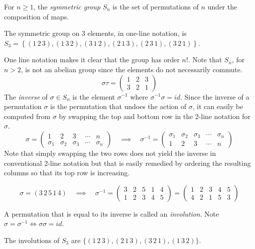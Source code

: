 \begin{definition}
For $n\geq 1$, the {\it symmetric group} $S_n$ is the set of permutations of $n$
under the composition of maps.  
\end{definition}
\begin{example}
The symmetric group on 3 elements, in one-line notation, is
$S_3= \left\{ (1\,2\,3),(1\,3\,2),(3\,1\,2),(2\,1\,3),(2\,3\,1),(3\,2\,1)\right\}$.
\end{example}
One line notation makes it clear that the group has order $n!$.
Note that $S_n$, for $n>2$, is not an abelian group since
the elements do not necessarily commute.
$$
\sigma\tau=
\begin{pmatrix}
1&2&3\\
3&2&1
\end{pmatrix}
$$
The {\it inverse} of $\sigma\in S_n$
is the element $\sigma^{-1}$ where
$\sigma^{-1}\sigma = id$.  Since the inverse of
a permutation $\sigma$ is the permutation that
undoes the action of $\sigma$, it can easily be 
computed from $\sigma$ by swapping the top and 
bottom row in the 2-line notation for $\sigma$.
$$
\sigma=\left(\begin{matrix}
1&2&3&\cdots&n\\
\sigma_1&\sigma_2&\sigma_3&\cdots&\sigma_n
\end{matrix}
\right)
\quad\implies\quad
\sigma^{-1}=
\left(\begin{matrix}
\sigma_1&\sigma_2&\sigma_3&\cdots&\sigma_n\\
1&2&3&\cdots&n
\end{matrix}
\right)
$$
Note that simply swapping the two rows does not yield the inverse in conventional 2-line notation but
that is easily remedied by ordering the resulting columns so that its top row is increasing.
\begin{example}
$$
\sigma = (3\,2\,5\,1\,4)\quad\implies\quad
\sigma^{-1}=
\left(\begin{matrix}
3&2&5&1&4\\
1&2&3&4&5
\end{matrix}
\right)
=
\left(\begin{matrix}
1&2&3&4&5\\
4&2&1&5&3
\end{matrix}
\right)
$$
\end{example}

\begin{definition}
A permutation that is equal to its inverse is called
an {\it involution}.  Note 
$\sigma=\sigma^{-1}\iff \sigma\sigma=id$.
\end{definition}
\begin{example}
The involutions of $S_3$ are
$\{
(1\,2\,3), (2\,1\,3), (3\,2\,1), (1\,3\,2)\}$.
\end{example}

